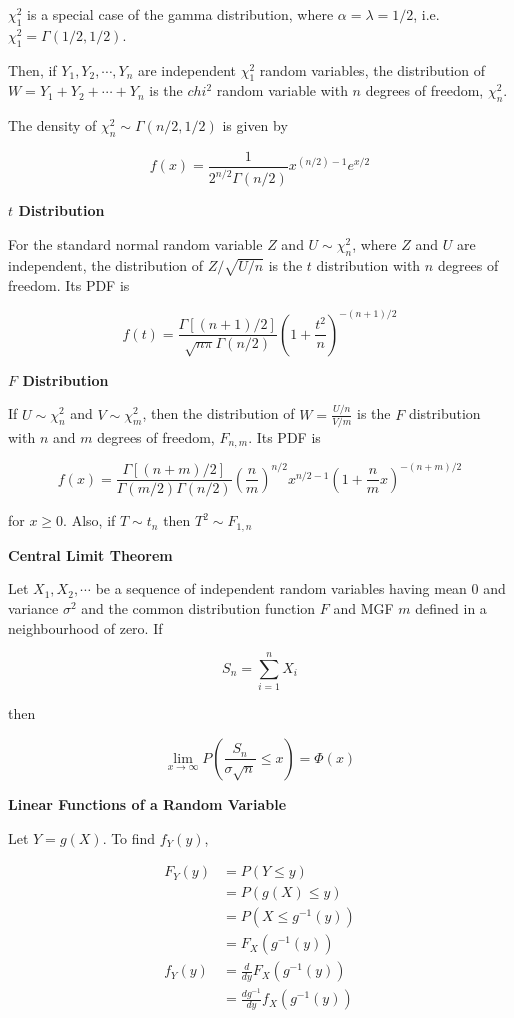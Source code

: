 \documentclass[a4paper]{article}
\newcommand{\subheading}[1]{{\scriptsize\textbf{#1}}}
\begin{document}
\begin{multicols*}{4}
$\chi^2_1$ is a special case of the gamma distribution, where $\alpha = \lambda
= 1/2$, i.e. $\chi^2_1 = \Gamma(1/2, 1/2)$. \smallskip

Then, if $Y_1, Y_2, \cdots, Y_n$ are independent $\chi^2_1$ random variables,
the distribution of $W = Y_1 + Y_2 + \cdots + Y_n$ is the $chi^2$ random
variable with $n$ degrees of freedom, $\chi^2_n$. \smallskip

The density of $\chi^2_n \sim \Gamma(n/2, 1/2)$ is given by

$$f(x) = \frac{1}{2^{n/2} \Gamma(n/2)} x^{(n/2) - 1} e^{x/2}$$

\subheading{$t$ Distribution}

For the standard normal random variable $Z$ and $U \sim \chi^2_n$, where $Z$ and
$U$ are independent, the distribution of $Z / \sqrt{U/n}$ is the $t$
distribution with $n$ degrees of freedom. Its PDF is

$$f(t) = \frac{\Gamma[(n+1)/2]}{\sqrt{n\pi}\Gamma(n/2)}
  \left ( 1 + \frac{t^2}{n} \right )^{-(n+1)/2} $$

\subheading{$F$ Distribution}

If $U \sim \chi^2_n$ and $V \sim \chi^2_m$, then the distribution of $W =
\frac{U/n}{V/m}$ is the $F$ distribution with $n$ and $m$ degrees of freedom,
$F_{n, m}$. Its PDF is

{\tiny
$$f(x) = \frac{\Gamma[(n+m)/2]}{\Gamma(m/2)\Gamma(n/2)}
  \left ( \frac{n}{m} \right )^{n/2}
  x^{n/2 -1}
  \left (1 + \frac{n}{m}x \right )^{-(n+m)/2}$$
}

for $x \geq 0$. Also, if $T \sim t_n$ then $T^2 \sim F_{1,n}$ \smallskip

\subheading{Central Limit Theorem}

Let $X_1, X_2, \cdots$ be a sequence of independent random variables having mean
0 and variance $\sigma^2$ and the common distribution function $F$ and MGF $m$
defined in a neighbourhood of zero. If

$$S_n = \sum^n_{i=1} X_i$$

then

$$\lim_{x\rightarrow \infty}
  P \left ( \frac{S_n}{\sigma \sqrt{n}} \leq x \right )
  = \Phi(x)$$

\subheading{Linear Functions of a Random Variable}

Let $Y = g(X)$. To find $f_Y(y)$,

\begin{align*}
  F_Y(y) &= P(Y \leq y) \\
    &= P(g(X) \leq y) \\
    &= P(X \leq g^{-1}(y)) \\
    &= F_X(g^{-1}(y)) \\
  f_Y(y) &= \frac{d}{dy} F_X(g^{-1}(y)) \\
    &= \frac{dg^{-1}}{dy} f_X(g^{-1}(y))
\end{align*}


\end{multicols*}
\end{document}
